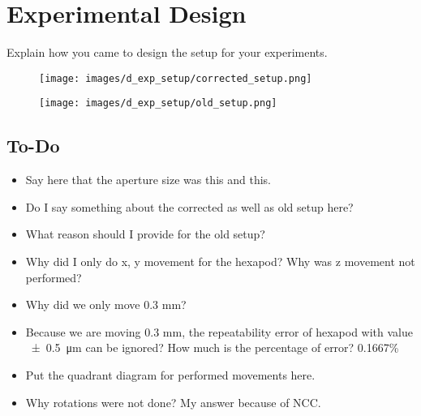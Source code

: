 \chapter{Experimental Design}

Explain how you came to design the setup for your experiments.

\begin{figure}[h]
    \centering
    \texttt{[image: images/d\_exp\_setup/corrected\_setup.png]}
\end{figure}
\begin{figure}[h]
    \centering
    \texttt{[image: images/d\_exp\_setup/old\_setup.png]}
\end{figure}
\section*{To-Do}
\begin{itemize}
    \item Say here that the aperture size was this and this.
    \item Do I say something about the corrected as well as old setup here?
    \item What reason should I provide for the old setup?
    \item Why did I only do x, y movement for the hexapod? Why was z movement not performed?
    \item Why did we only move 0.3 mm?
    \item Because we are moving 0.3 mm, the repeatability error of hexapod with value \SI{\pm0.5}{\micro\meter} can be ignored? How much is the percentage of error? 0.1667\%
    \item Put the quadrant diagram for performed movements here.
    \item Why rotations were not done? My answer because of NCC.
\end{itemize}